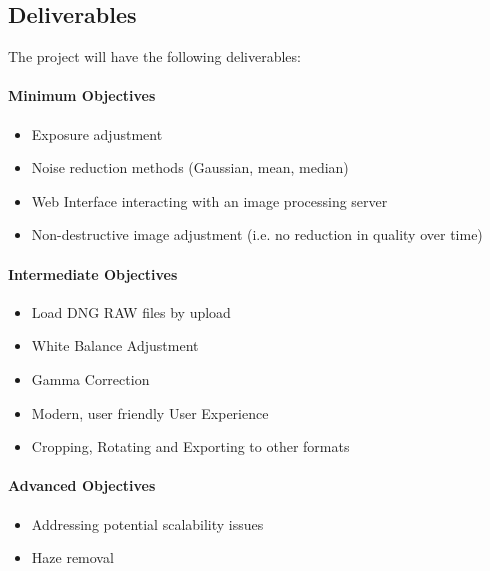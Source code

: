 \documentclass[12pt,a4paper]{article}
\begin{document}
\subsection{Deliverables}
The project will have the following deliverables:

\paragraph{Minimum Objectives}
    \begin{itemize}
      \item Exposure adjustment
      \item Noise reduction methods (Gaussian, mean, median)
      \item Web Interface interacting with an image processing server
      \item Non-destructive image adjustment (i.e. no reduction in quality over time)
    \end{itemize}
\paragraph{Intermediate Objectives}
    \begin{itemize}
      \item Load DNG RAW files by upload
      \item White Balance Adjustment
      \item Gamma Correction
      \item Modern, user friendly User Experience
      \item Cropping, Rotating and Exporting to other formats
    \end{itemize}
\paragraph{Advanced Objectives}
    \begin{itemize}
      \item Addressing potential scalability issues
      \item Haze removal
    \end{itemize}
\end{document}
